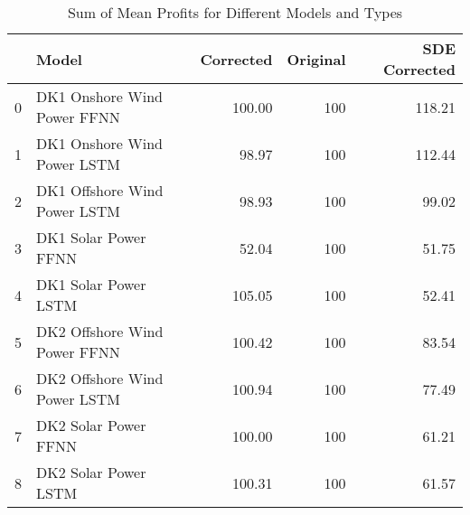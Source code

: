 \begin{table}
\caption{Sum of Mean Profits for Different Models and Types}
\label{table:mean_profits}
\begin{tabular}{llrrr}
\toprule
 & Model & Corrected & Original & SDE Corrected \\
\midrule
0 & DK1 Onshore Wind Power FFNN & 100.00 & 100 & 118.21 \\
1 & DK1 Onshore Wind Power LSTM & 98.97 & 100 & 112.44 \\
2 & DK1 Offshore Wind Power LSTM & 98.93 & 100 & 99.02 \\
3 & DK1 Solar Power FFNN & 52.04 & 100 & 51.75 \\
4 & DK1 Solar Power LSTM & 105.05 & 100 & 52.41 \\
5 & DK2 Offshore Wind Power FFNN & 100.42 & 100 & 83.54 \\
6 & DK2 Offshore Wind Power LSTM & 100.94 & 100 & 77.49 \\
7 & DK2 Solar Power FFNN & 100.00 & 100 & 61.21 \\
8 & DK2 Solar Power LSTM & 100.31 & 100 & 61.57 \\
\bottomrule
\end{tabular}
\end{table}
